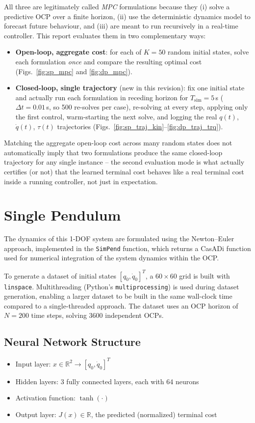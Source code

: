 \documentclass[11pt,a4paper]{article}
\begin{document}
All three are legitimately called \emph{MPC} formulations because they (i) solve a predictive
OCP over a finite horizon, (ii) use the deterministic dynamics model to forecast future
behaviour, and (iii) are meant to run recursively in a real-time controller. This report
evaluates them in two complementary ways:
\begin{itemize}
  \item \textbf{Open-loop, aggregate cost}: for each of $K=50$ random initial states, solve each
        formulation \emph{once} and compare the resulting optimal cost (Figs.~\ref{fig:sp_mpc}
        and \ref{fig:dp_mpc}).
  \item \textbf{Closed-loop, single trajectory} (new in this revision): fix one initial state and
        actually run each formulation in receding horizon for $T_{\text{sim}}=5\,$s
        ($\Delta t = 0.01\,$s, so 500 re-solves per case), re-solving at every step, applying only
        the first control, warm-starting the next solve, and logging the real $q(t)$, $\dot
        q(t)$, $\tau(t)$ trajectories (Figs.~\ref{fig:sp_traj_kin}--\ref{fig:dp_traj_trq}).
\end{itemize}
Matching the aggregate open-loop cost across many random states does not automatically imply
that two formulations produce the same closed-loop trajectory for any single instance -- the
second evaluation mode is what actually certifies (or not) that the learned terminal cost
behaves like a real terminal cost inside a running controller, not just in expectation.

\section{Single Pendulum}

The dynamics of this 1-DOF system are formulated using the Newton--Euler approach, implemented
in the \texttt{SimPend} function, which returns a CasADi function used for numerical integration
of the system dynamics within the OCP.

To generate a dataset of initial states $[q_0, \dot q_0]^T$, a $60\times 60$ grid is built with
\texttt{linspace}. Multithreading (Python's \texttt{multiprocessing}) is used during dataset
generation, enabling a larger dataset to be built in the same wall-clock time compared to a
single-threaded approach. The dataset uses an OCP horizon of $N=200$ time steps, solving 3600
independent OCPs.

\subsection{Neural Network Structure}
\begin{itemize}
  \item Input layer: $x \in \mathbb{R}^2 \to [q_0, \dot q_0]^T$
  \item Hidden layers: 3 fully connected layers, each with 64 neurons
  \item Activation function: $\tanh(\cdot)$
  \item Output layer: $J(x) \in \mathbb{R}$, the predicted (normalized) terminal cost
\end{itemize}
\end{document}
